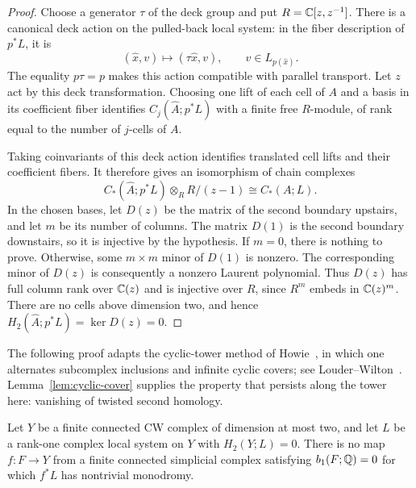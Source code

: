 \begin{proof}
Choose a generator $\tau$ of the deck group and put
$R=\mathbb C[z,z^{-1}]$.  There is a canonical deck action on the pulled-back
local system: in the fiber description of $p^*L$, it is
\begin{equation}
  (\widehat x,v)\longmapsto(\tau\widehat x,v),
  \qquad v\in L_{p(\widehat x)}.
  \label{eq:canonical-deck-action}
\end{equation}
The equality $p\tau=p$ makes this action compatible with parallel
transport.  Let $z$ act by this deck transformation.  Choosing one lift
of each cell of $A$ and a basis in its coefficient fiber identifies
$C_j(\widehat A;p^*L)$ with a finite free $R$-module, of rank equal to
the number of $j$-cells of $A$.

Taking coinvariants of this deck action identifies translated cell
lifts and their coefficient fibers.  It therefore gives an isomorphism
of chain complexes
\begin{equation}
  C_*(\widehat A;p^*L)\otimes_R R/(z-1)
  \cong C_*(A;L).
  \label{eq:cyclic-specialization}
\end{equation}
In the chosen bases, let $D(z)$ be the matrix of the second boundary
upstairs, and let $m$ be its number of columns.  The matrix $D(1)$ is
the second boundary downstairs, so it is injective by the hypothesis.
If $m=0$, there is nothing to prove.  Otherwise, some $m\times m$ minor
of $D(1)$ is nonzero.  The corresponding minor of $D(z)$ is consequently
a nonzero Laurent polynomial.  Thus $D(z)$ has full column rank over
$\mathbb C(z)$ and is injective over $R$, since $R^m$ embeds in $\mathbb C(z)^m$.
There are no cells above dimension two, and hence
$H_2(\widehat A;p^*L)=\ker D(z)=0$.
\end{proof}

The following proof adapts the cyclic-tower method of
Howie~\cite{Howie81Pairs}, in which one alternates subcomplex inclusions
and infinite cyclic covers; see Louder--Wilton~\cite[Section~3]{LouderWilton17}.
Lemma~\ref{lem:cyclic-cover} supplies the property that persists along
the tower here: vanishing of twisted second homology.

\begin{theorem}
\label{thm:tower}
Let $Y$ be a finite connected CW complex of dimension at most two, and
let $L$ be a rank-one complex local system on $Y$ with $H_2(Y;L)=0$.
There is no map $f:F\to Y$ from a finite connected simplicial complex
satisfying $b_1(F;\mathbb Q)=0$ for which $f^*L$ has nontrivial monodromy.
\end{theorem}


